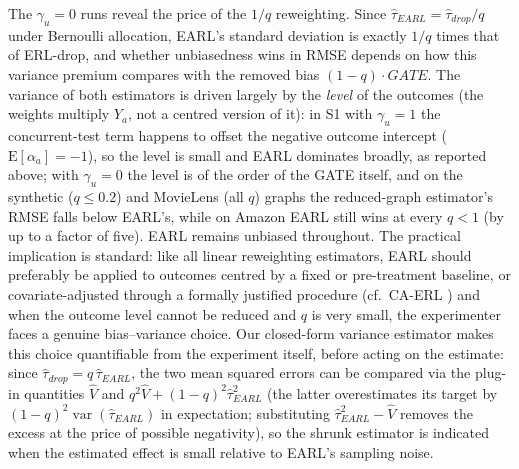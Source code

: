 \documentclass[sigconf]{acmart}
\newcommand{\E}{\mathrm E}
\DeclareMathOperator{\var}{var}
\begin{document}
The $\gamma_u=0$ runs reveal the price of the $1/q$ reweighting. Since $\hat\tau_{EARL} = \hat\tau_{drop}/q$ under Bernoulli allocation, EARL's standard deviation is exactly $1/q$ times that of ERL-drop, and whether unbiasedness wins in RMSE depends on how this variance premium compares with the removed bias $(1-q)\cdot GATE$. The variance of both estimators is driven largely by the \emph{level} of the outcomes (the weights multiply $Y_a$, not a centred version of it): in S1 with $\gamma_u=1$ the concurrent-test term happens to offset the negative outcome intercept ($\E[\alpha_a]=-1$), so the level is small and EARL dominates broadly, as reported above; with $\gamma_u=0$ the level is of the order of the GATE itself, and on the synthetic ($q\le 0.2$) and MovieLens (all $q$) graphs the reduced-graph estimator's RMSE falls below EARL's, while on Amazon EARL still wins at every $q<1$ (by up to a factor of five). EARL remains unbiased throughout. The practical implication is standard: like all linear reweighting estimators, EARL should preferably be applied to outcomes centred by a fixed or pre-treatment baseline, or covariate-adjusted through a formally justified procedure (cf.\ CA-ERL \cite{shi2025scalableanalysisbipartiteexperiments}) and when the outcome level cannot be reduced and $q$ is very small, the experimenter faces a genuine bias--variance choice. Our closed-form variance estimator makes this choice quantifiable from the experiment itself, before acting on the estimate: since $\hat\tau_{drop}=q\,\hat\tau_{EARL}$, the two mean squared errors can be compared via the plug-in quantities $\hat V$ and $q^2\hat V + (1-q)^2\hat\tau^2_{EARL}$ (the latter overestimates its target by $(1-q)^2\var(\hat\tau_{EARL})$ in expectation; substituting $\hat\tau^2_{EARL}-\hat V$ removes the excess at the price of possible negativity), so the shrunk estimator is indicated when the estimated effect is small relative to EARL's sampling noise.
\end{document}
